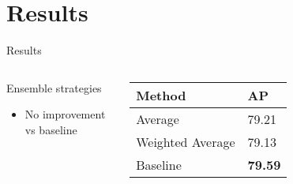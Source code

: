 \section{Results}
\begin{frame}{Results}{}
\begin{columns}
    \begin{block}{Ensemble strategies}
    \begin{itemize}
        \item No improvement vs baseline
    \end{itemize}  
\end{block}  
    \begin{table}[h]
    \centering
    \begin{tabular}{|l|l|}
    \hline
    \textbf{Method}           & \textbf{AP} \\ \hline
    Average          & 79.21 \\ \hline
    Weighted Average & 79.13 \\ \hline
    Baseline         & \textbf{79.59} \\ \hline
    \end{tabular}
    \end{table}   

\end{columns}
\end{frame}

